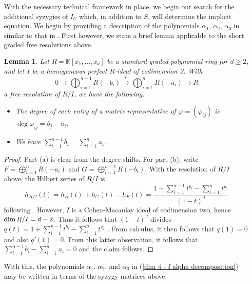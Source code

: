 \documentclass[reqno]{amsart}
\newtheorem{lemma}[thm]{Lemma}
\numberwithin{equation}{section}
\theoremstyle{definition}
\def\K{\mathbb{K}}
\def\dim{\mathop{\rm dim}}
\begin{document}
With the necessary technical framework in place, we begin our search for the additional syzygies of $I_U$ which, in addition to $S$, will determine the implicit equation. We begin by providing a description of the polynomials $\alpha_1$, $\alpha_2$, $\alpha_3$ in  similar to that in . First however, we state a brief lemma applicable to the short graded free resolutions above. 








\begin{lemma}\label{HB degree shift lemma}
Let $R=\K[x_1,\ldots,x_d]$ be a standard graded polynomial ring for $d\geq 2$, and let $I$ be a homogeneous perfect $R$-ideal of codimension 2. With 
\[
0\longrightarrow \bigoplus_{i=1}^{n-1} R(-b_i) \overset{\varphi}{\longrightarrow} \bigoplus_{i=1}^{n} R(-a_i) \longrightarrow R 
\]
a free resolution of $R/I$, we have the following.
\begin{itemize}
    \item[(a)] The degree of each entry of a matrix representative of $\varphi = (\varphi_{ij})$ is $\deg \varphi_{ij} = b_j-a_i$.
\vspace{1mm}

    \item[(b)] We have $\sum_{i=1}^{n-1} b_i =  \sum_{i=1}^{n} a_i$.
\end{itemize}
\end{lemma}

\begin{proof}
Part (a) is clear from the degree shifts. For part (b), write $F= \bigoplus_{i=1}^{n} R(-a_i)$ and $G=\bigoplus_{i=1}^{n-1} R(-b_i)$. With the resolution of $R/I$ above, the Hilbert series of $R/I$ is 
$$h_{R/I}(t) = h_R(t) + h_G(t) - h_F(t) = \frac{1+\sum_{i=1}^{n-1} t^{b_i} - \sum_{i=1}^{n} t^{a_i} }{(1-t)^d}$$ 
following \cite[4.1.13]{BH93}. However, $I$ is a Cohen-Macaulay ideal of codimension two, hence $\dim R/I =d-2$. Thus it follows that $(1-t)^2$ divides $q(t) = 1+\sum_{i=1}^{n-1} t^{b_i} - \sum_{i=1}^{n} t^{a_i}$ \cite[4.1.8]{BH93}. From calculus, it then follows that $q(1)=0$ and also $q'(1)=0$. From this latter observation, it follows that $\sum_{i=1}^{n-1} {b_i} - \sum_{i=1}^{n} {a_i} =0$ and the claim follows.
\end{proof}


With this, the polynomials $\alpha_1$, $\alpha_2$, and  $\alpha_3$ in (\ref{dim 4 - f alpha decomposition}) may be written in terms of the syzygy matrices above.
\end{document}
